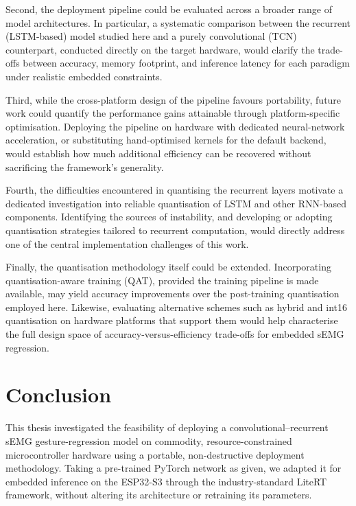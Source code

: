 \documentclass[12pt,DIV16,BCOR12mm,a4paper,footinclude=false,headinclude,parskip=half-,twoside,openright,cleardoublepage=empty,toc=index,bibliography=totoc,listof=totoc]{scrreprt}
\numberwithin{equation}{chapter}
\begin{document}
    Second, the deployment pipeline could be evaluated across a broader range of model
    architectures. In particular, a systematic comparison between the recurrent (LSTM-based)
    model studied here and a purely convolutional (TCN) counterpart, conducted directly on the
    target hardware, would clarify the trade-offs between accuracy, memory footprint, and
    inference latency for each paradigm under realistic embedded constraints.

    Third, while the cross-platform design of the pipeline favours portability, future work
    could quantify the performance gains attainable through platform-specific optimisation.
    Deploying the pipeline on hardware with dedicated neural-network acceleration, or
    substituting hand-optimised kernels for the default backend, would establish how much
    additional efficiency can be recovered without sacrificing the framework's generality.

    Fourth, the difficulties encountered in quantising the recurrent layers motivate a dedicated
    investigation into reliable quantisation of LSTM and other RNN-based components. Identifying
    the sources of instability, and developing or adopting quantisation strategies tailored to
    recurrent computation, would directly address one of the central implementation challenges
    of this work.

    Finally, the quantisation methodology itself could be extended. Incorporating
    quantisation-aware training (QAT), provided the training pipeline is made available, may
    yield accuracy improvements over the post-training quantisation employed here. Likewise,
    evaluating alternative schemes such as hybrid and int16 quantisation on hardware platforms
    that support them would help characterise the full design space of accuracy-versus-efficiency
    trade-offs for embedded sEMG regression.

  \section{Conclusion}
    This thesis investigated the feasibility of deploying a convolutional--recurrent sEMG
    gesture-regression model on commodity, resource-constrained microcontroller hardware
    using a portable, non-destructive deployment methodology. Taking a pre-trained PyTorch
    network as given, we adapted it for embedded inference on the ESP32-S3 through the
    industry-standard LiteRT framework, without altering its architecture or retraining its
    parameters.
\end{document}
